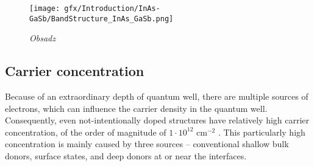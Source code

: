 \documentclass[titlepage,a4paper]{book}
\begin{document}
\begin{figure}[ht]
	\centering
	\texttt{[image: gfx/Introduction/InAs-GaSb/BandStructure\_InAs\_GaSb.png]}
	\vspace{-10pt}
	\caption{\textit{Obsadz}}
	\label{fig:BandStructure_InAs_GaSb}
\end{figure} 

\subsection{Carrier concentration}
Because of an extraordinary depth of quantum well, there are multiple sources of electrons, which can influence the carrier density in the quantum well. Consequently, even not-intentionally doped structures have relatively high carrier concentration, of the order of magnitude of $1 \cdot 10^{12}$ cm$^{-2}$ \cite{Tuttle_InAs_concentration}. This particularly high concentration is mainly caused by three sources -- conventional shallow bulk donors, surface states, and deep donors at or near the interfaces. 
\end{document}

